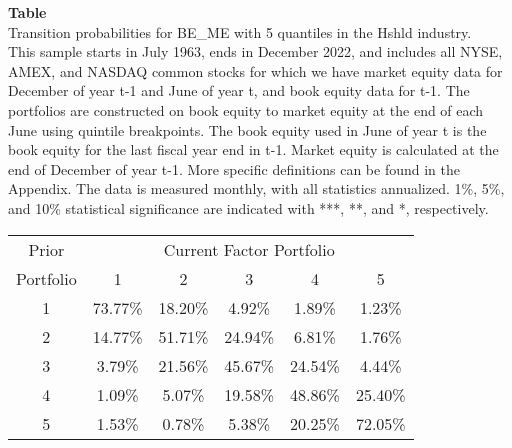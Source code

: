 \begin{table*}[ht!]
\raggedright
{}
\label{tab: transition_probs_BE_ME_Hshld_with_5_quantiles}
\textbf{Table \thetable} \\
Transition probabilities for BE_ME with 5 quantiles in the Hshld industry. \\
\hspace*{1em}This sample starts in July 1963, ends in December 2022, and includes all NYSE, AMEX, and NASDAQ common stocks for which we have market equity data for December of year t-1 and June of year t, and book equity data for t-1. The portfolios are constructed on book equity to market equity at the end of each June using quintile breakpoints.  The book equity used in June of year t is the book equity for the last fiscal year end in t-1.  Market equity is calculated at the end of December of year t-1.  More specific definitions can be found in the Appendix.  The data is measured monthly, with all statistics annualized.  1\%, 5\%, and 10\% statistical significance are indicated with ***, **, and *, respectively. \\
\vspace{0.5em}
\centering
\begin{adjustbox}{max width=\textwidth}
\begin{tabular}{@{}cccccc@{}}
\toprule
Prior & \multicolumn{5}{c}{Current Factor Portfolio} \\
Portfolio & 1 & 2 & 3 & 4 & 5 \\
\midrule
1 & 73.77\% & 18.20\% & 4.92\% & 1.89\% & 1.23\% \\
2 & 14.77\% & 51.71\% & 24.94\% & 6.81\% & 1.76\% \\
3 & 3.79\% & 21.56\% & 45.67\% & 24.54\% & 4.44\% \\
4 & 1.09\% & 5.07\% & 19.58\% & 48.86\% & 25.40\% \\
5 & 1.53\% & 0.78\% & 5.38\% & 20.25\% & 72.05\% \\
\bottomrule
\end{tabular}
\end{adjustbox}
\end{table*}